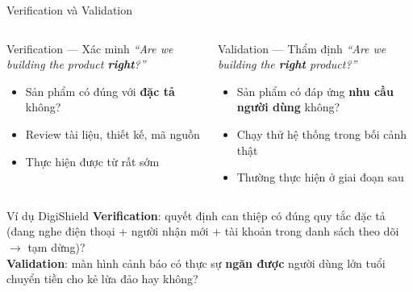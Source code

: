 \documentclass[aspectratio=169,12pt]{beamer}
\begin{document}
\begin{frame}{Verification và Validation}
  \begin{columns}
    \begin{block}{Verification --- Xác minh}
      \emph{``Are we building the product \textbf{right}?''}
      \begin{itemize}
        \item Sản phẩm có đúng với \textbf{đặc tả} không?
        \item Review tài liệu, thiết kế, mã nguồn
        \item Thực hiện được từ rất sớm
      \end{itemize}
    \end{block}

    \begin{block}{Validation --- Thẩm định}
      \emph{``Are we building the \textbf{right} product?''}
      \begin{itemize}
        \item Sản phẩm có đáp ứng \textbf{nhu cầu người dùng} không?
        \item Chạy thử hệ thống trong bối cảnh thật
        \item Thường thực hiện ở giai đoạn sau
      \end{itemize}
    \end{block}
  \end{columns}

  \vspace{0.2em}
  \begin{exampleblock}{Ví dụ DigiShield}
    \small
    \textbf{Verification}: quyết định can thiệp có đúng quy tắc đặc tả
    (đang nghe điện thoại + người nhận mới + tài khoản trong danh sách theo dõi
    $\to$ tạm dừng)?\\
    \textbf{Validation}: màn hình cảnh báo có thực sự \textbf{ngăn được} người dùng
    lớn tuổi chuyển tiền cho kẻ lừa đảo hay không?
  \end{exampleblock}
\end{frame}
\end{document}
